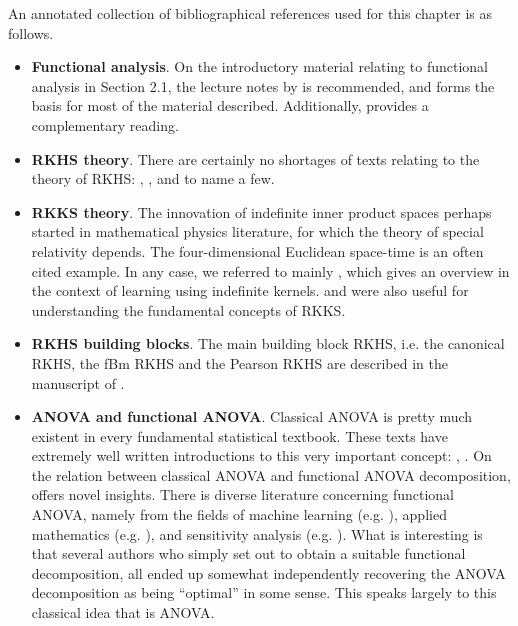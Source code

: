 \documentclass[a4paper,showframe,11pt]{report}
\begin{document}
An annotated collection of bibliographical references used for this chapter is as follows.
\begin{itemize}
  \item \textbf{Functional analysis}. On the introductory material relating to functional analysis in Section 2.1, the lecture notes by \citet{sejdinovic2012} is recommended, and forms the basis for most of the material described. Additionally, \citet{rudin1987real} provides a complementary reading.
  \item \textbf{RKHS theory}. There are certainly no shortages of texts relating to the theory of RKHS: \citet{steinwart2008support}, \citet{berlinet2011reproducing}, and \citet{gu2013smoothing} to name a few.
  \item \textbf{RKKS theory}. The innovation of indefinite inner product spaces perhaps started in mathematical physics literature, for which the theory of special relativity depends. The four-dimensional Euclidean space-time is an often cited example. In any case, we referred to mainly \citet{ong2004learning}, which gives an overview in the context of learning using indefinite kernels. \citet{alpay1991some} and \citet{zafeiriou2012subspace} were also useful for understanding the fundamental concepts of RKKS.
  \item \textbf{RKHS building blocks}. The main building block RKHS, i.e. the canonical RKHS, the fBm RKHS and the Pearson RKHS are described in the manuscript of \citet{bergsma2017}.
  \item \textbf{ANOVA and functional ANOVA}. Classical ANOVA is pretty much existent in every fundamental statistical textbook. These texts have extremely well written introductions to this very important concept: \citet[Ch. 11]{casella2002statistical}, \citet[Ch. 3]{dean1999design}. On the relation between classical ANOVA and functional ANOVA decomposition, \citet{gu2013smoothing} offers novel insights. There is diverse literature concerning functional ANOVA, namely from the fields of machine learning (e.g. \cite{durrande2013anova}), applied mathematics (e.g. \cite{kuo2010decompositions}), and sensitivity analysis (e.g. \cite{sobol2001global}). What is interesting is that several authors who simply set out to obtain a suitable functional decomposition, all ended up somewhat independently recovering the ANOVA decomposition as being ``optimal'' in some sense. This speaks largely to this classical idea that is ANOVA.
\end{itemize}





\hClosingStuffStandalone
\end{document}
